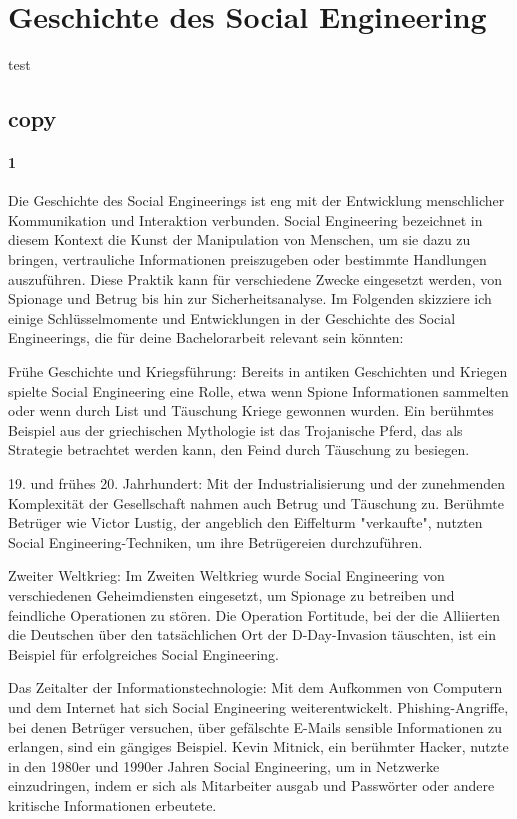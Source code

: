 \section{Geschichte des Social Engineering}

test

\subsection*{copy}

\paragraph*{1}
Die Geschichte des Social Engineerings ist eng mit der Entwicklung menschlicher Kommunikation und Interaktion verbunden. Social Engineering bezeichnet in diesem Kontext die Kunst der Manipulation von Menschen, um sie dazu zu bringen, vertrauliche Informationen preiszugeben oder bestimmte Handlungen auszuführen. Diese Praktik kann für verschiedene Zwecke eingesetzt werden, von Spionage und Betrug bis hin zur Sicherheitsanalyse. Im Folgenden skizziere ich einige Schlüsselmomente und Entwicklungen in der Geschichte des Social Engineerings, die für deine Bachelorarbeit relevant sein könnten:

Frühe Geschichte und Kriegsführung: Bereits in antiken Geschichten und Kriegen spielte Social Engineering eine Rolle, etwa wenn Spione Informationen sammelten oder wenn durch List und Täuschung Kriege gewonnen wurden. Ein berühmtes Beispiel aus der griechischen Mythologie ist das Trojanische Pferd, das als Strategie betrachtet werden kann, den Feind durch Täuschung zu besiegen.

19. und frühes 20. Jahrhundert: Mit der Industrialisierung und der zunehmenden Komplexität der Gesellschaft nahmen auch Betrug und Täuschung zu. Berühmte Betrüger wie Victor Lustig, der angeblich den Eiffelturm "verkaufte", nutzten Social Engineering-Techniken, um ihre Betrügereien durchzuführen.

Zweiter Weltkrieg: Im Zweiten Weltkrieg wurde Social Engineering von verschiedenen Geheimdiensten eingesetzt, um Spionage zu betreiben und feindliche Operationen zu stören. Die Operation Fortitude, bei der die Alliierten die Deutschen über den tatsächlichen Ort der D-Day-Invasion täuschten, ist ein Beispiel für erfolgreiches Social Engineering.

Das Zeitalter der Informationstechnologie: Mit dem Aufkommen von Computern und dem Internet hat sich Social Engineering weiterentwickelt. Phishing-Angriffe, bei denen Betrüger versuchen, über gefälschte E-Mails sensible Informationen zu erlangen, sind ein gängiges Beispiel. Kevin Mitnick, ein berühmter Hacker, nutzte in den 1980er und 1990er Jahren Social Engineering, um in Netzwerke einzudringen, indem er sich als Mitarbeiter ausgab und Passwörter oder andere kritische Informationen erbeutete.

